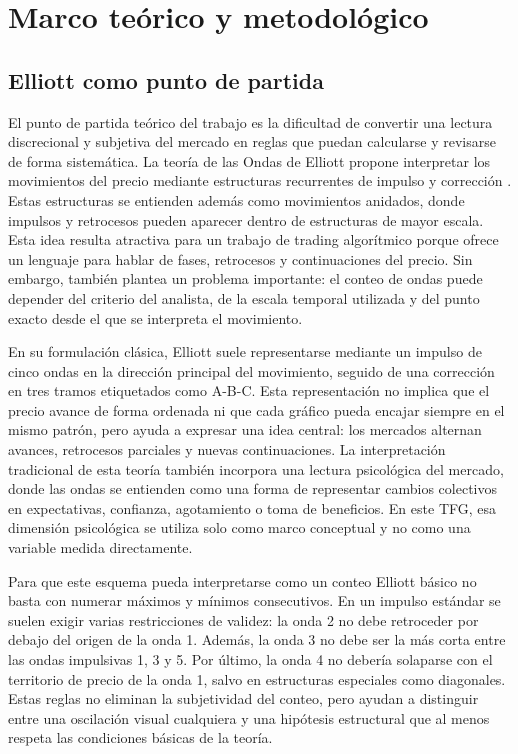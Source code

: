 \section{Marco te\'orico y metodol\'ogico}
\label{sec:metodologia-marco-teorico}

\subsection{Elliott como punto de partida}
\label{subsec:elliott-punto-partida}

El punto de partida te\'orico del trabajo es la dificultad de convertir una
lectura discrecional y subjetiva del mercado en reglas que puedan calcularse y
revisarse de forma sistem\'atica. La teor\'ia de las Ondas de Elliott propone
interpretar los movimientos del precio mediante estructuras recurrentes de
impulso y correcci\'on \cite{frost_prechter_1985_elliott}. Estas estructuras se
entienden adem\'as como movimientos anidados, donde impulsos y retrocesos pueden
aparecer dentro de estructuras de mayor escala. Esta idea resulta atractiva para
un trabajo de trading algor\'itmico porque ofrece un lenguaje para hablar de
fases, retrocesos y continuaciones del precio. Sin embargo, tambi\'en plantea un
problema importante: el conteo de ondas puede depender del criterio del
analista, de la escala temporal utilizada y del punto exacto desde el que se
interpreta el movimiento.

En su formulaci\'on cl\'asica, Elliott suele representarse mediante un impulso
de cinco ondas en la direcci\'on principal del movimiento, seguido de una
correcci\'on en tres tramos etiquetados como A-B-C. Esta representaci\'on no
implica que el precio avance de forma ordenada ni que cada gr\'afico pueda
encajar siempre en el mismo patr\'on, pero ayuda a expresar una idea central:
los mercados alternan avances, retrocesos parciales y nuevas continuaciones.
La interpretaci\'on tradicional de esta teor\'ia tambi\'en incorpora una lectura
psicol\'ogica del mercado, donde las ondas se entienden como una forma de
representar cambios colectivos en expectativas, confianza, agotamiento o toma
de beneficios. En este TFG, esa dimensi\'on psicol\'ogica se utiliza solo como
marco conceptual y no como una variable medida directamente.

Para que este esquema pueda interpretarse como un conteo Elliott b\'asico no
basta con numerar m\'aximos y m\'inimos consecutivos. En un impulso est\'andar se
suelen exigir varias restricciones de validez: la onda 2 no debe retroceder por
debajo del origen de la onda 1. Adem\'as, la onda 3 no debe ser la m\'as corta
entre las ondas impulsivas 1, 3 y 5. Por \'ultimo, la onda 4 no deber\'ia solaparse
con el territorio de precio de la onda 1, salvo en estructuras especiales como diagonales. Estas
reglas no eliminan la subjetividad del conteo, pero ayudan a distinguir entre
una oscilaci\'on visual cualquiera y una hip\'otesis estructural que al menos
respeta las condiciones b\'asicas de la teor\'ia.

